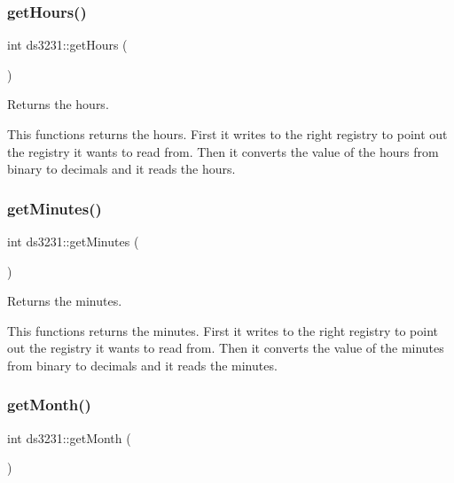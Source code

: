 \subsubsection{\texorpdfstring{get\+Hours()}{getHours()}}
{\footnotesize\ttfamily int ds3231\+::get\+Hours (\begin{DoxyParamCaption}{ }\end{DoxyParamCaption})\hspace{0.3cm}{\ttfamily [inline]}}



Returns the hours. 

This functions returns the hours. First it writes to the right registry to point out the registry it wants to read from. Then it converts the value of the hours from binary to decimals and it reads the hours. \mbox{\label{classds3231_a87b0afb6d653251f345dbf89bdfa88c4}} 
\subsubsection{\texorpdfstring{get\+Minutes()}{getMinutes()}}
{\footnotesize\ttfamily int ds3231\+::get\+Minutes (\begin{DoxyParamCaption}{ }\end{DoxyParamCaption})\hspace{0.3cm}{\ttfamily [inline]}}



Returns the minutes. 

This functions returns the minutes. First it writes to the right registry to point out the registry it wants to read from. Then it converts the value of the minutes from binary to decimals and it reads the minutes. \mbox{\label{classds3231_a7e1af01368e452db3fb31a091ed06321}} 
\subsubsection{\texorpdfstring{get\+Month()}{getMonth()}}
{\footnotesize\ttfamily int ds3231\+::get\+Month (\begin{DoxyParamCaption}{ }\end{DoxyParamCaption})\hspace{0.3cm}{\ttfamily [inline]}}



